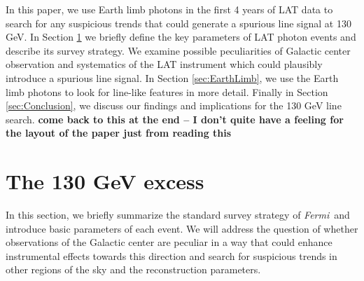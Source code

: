 \documentclass[aps,twocolumn,prd,superscriptaddress,showpacs,nofootinbib,fixfloat]{revtex4}
\newcommand{\Fermi}{{\slshape Fermi}}
\newcommand\Refsec[1]{Section \ref{sec:#1}}
\begin{document}
In this paper, we use Earth limb photons in the first 4
years of LAT data to search for any suspicious trends that
could generate a spurious line signal at 130 GeV.  In
\Refsec{130GeV} we briefly define the key parameters of LAT
photon events and describe its survey strategy. We examine
possible peculiarities of Galactic center observation and
systematics of the LAT instrument which could plausibly
introduce a spurious line signal. In \Refsec{EarthLimb}, we
use the Earth limb photons to look for line-like features in
more detail.  Finally in \Refsec{Conclusion}, we discuss our
findings and implications for the 130 GeV line search.  {\bf
come back to this at the end -- I don't quite have a feeling
for the layout of the paper just from reading this}



\section{The 130 GeV excess}
\label{sec:130GeV}
In this section, we briefly summarize the standard survey strategy of \Fermi\ 
and introduce basic parameters of each event.  We will
address the question of whether observations of the Galactic center
are peculiar in a way that could enhance instrumental
effects towards this direction and search for suspicious trends in
other regions of the sky and the reconstruction parameters.

\end{document}
